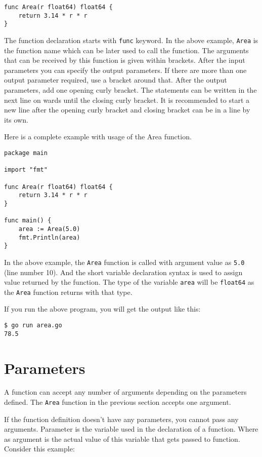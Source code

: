 \begin{lstlisting}[numbers=none]
func Area(r float64) float64 {
    return 3.14 * r * r
}
\end{lstlisting}

The function declaration starts with \texttt{func} keyword.  In the
above example, \texttt{Area} is the function name which can be later
used to call the function.  The arguments that can be received by this
function is given within brackets.  After the input parameters you can
specify the output parameters.  If there are more than one output
parameter required, use a bracket around that.  After the output
parameters, add one opening curly bracket.  The statements can be
written in the next line on wards until the closing curly bracket.  It
is recommended to start a new line after the opening curly bracket and
closing bracket can be in a line by its own.

Here is a complete example with usage of the Area function.

\begin{lstlisting}
package main

import "fmt"

func Area(r float64) float64 {
    return 3.14 * r * r
}

func main() {
    area := Area(5.0)
    fmt.Println(area)
}
\end{lstlisting}

In the above example, the \texttt{Area} function is called with
argument value as \texttt{5.0} (line number 10).  And the short
variable declaration syntax is used to assign value returned by the
function.  The type of the variable \texttt{area} will be
\texttt{float64} as the \texttt{Area} function returns with that type.

If you run the above program, you will get the output like this:

\begin{lstlisting}[numbers=none]
$ go run area.go
78.5
\end{lstlisting}

\section{Parameters}

A function can accept any number of arguments depending on the
parameters defined.  The \texttt{Area} function in the previous
section accepts one argument.

If the function definition doesn't have any parameters, you cannot
pass any arguments.  Parameter is the variable used
in the declaration of a function.  Where as
argument is the actual value of this
variable that gets passed to function.  Consider this example:

